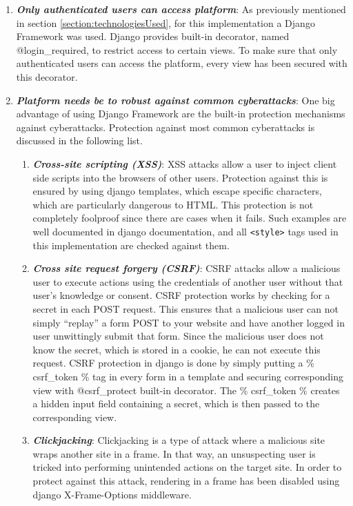 \begin{enumerate}
	\setlength{\itemsep}{1pt}
	\item \textbf{\textit{Only authenticated users can access platform}}: As previously mentioned in section \ref{section:technologiesUsed}, for this implementation a Django Framework was used. Django provides built-in decorator, named @login\_required, to restrict access to certain views. To make sure that only authenticated users can access the platform, every view has been secured with this decorator. 

	\item \textbf{\textit{Platform needs be to robust against common cyberattacks}}: One big advantage of using Django Framework are the built-in protection mechanisms against cyberattacks. Protection against most common cyberattacks is discussed in the following list.

		\begin{enumerate}
		\setlength{\itemsep}{1pt}
		\item \textbf{\textit{Cross-site scripting (XSS)}}: XSS attacks allow a user to inject client side scripts into the browsers of other users. Protection against this is ensured by using django templates, which escape specific characters, which are particularly dangerous to HTML. This protection is not completely foolproof since there are cases when it fails. Such examples are well documented in django documentation, and all \verb|<style>| tags used in this implementation are checked against them.

		\item \textbf{\textit{Cross site request forgery (CSRF)}}: CSRF attacks allow a malicious user to execute actions using the credentials of another user without that user's knowledge or consent. CSRF protection works by checking for a secret in each POST request. This ensures that a malicious user can not simply ``replay'' a form POST to your website and have another logged in user unwittingly submit that form. Since the malicious user does not know the secret, which is stored in a cookie, he can not execute this request. CSRF protection in django is done by simply putting a {\% csrf\_token \%} tag in every form in a template and securing corresponding view with @csrf\_protect built-in decorator. The {\% csrf\_token \%} creates a hidden input field containing a secret, which is then passed to the corresponding view.

		\item \textbf{\textit{Clickjacking}}: Clickjacking is a type of attack where a malicious site wraps another site in a frame. In that way, an unsuspecting user is tricked into performing unintended actions on the target site. In order to protect against this attack, rendering in a frame has been disabled using django X-Frame-Options middleware.


\end{enumerate}
\end{enumerate}
